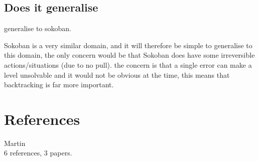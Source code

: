 \documentclass[letterpaper]{article}
\begin{document}
	\subsection{Does it generalise}
	
	
	generalise to sokoban.
	
	Sokoban is a very similar domain, and it will therefore be simple to generalise to this domain, the only concern would be that Sokoban does have some irreversible actions/situations (due to no pull). the concern is that a single error can make a level unsolvable and it would not be obvious at the time, this means that backtracking is far more important.
	
	
\section{References}
	Martin\\
	6 references, 3 papers.
		
		


\end{document}

